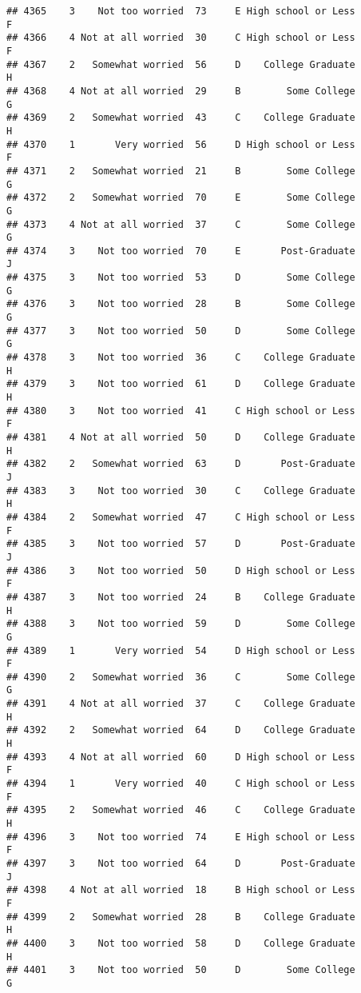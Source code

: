 \documentclass[
]{article}
\begin{document}
\begin{verbatim}
## 4365    3    Not too worried  73     E High school or Less         F
## 4366    4 Not at all worried  30     C High school or Less         F
## 4367    2   Somewhat worried  56     D    College Graduate         H
## 4368    4 Not at all worried  29     B        Some College         G
## 4369    2   Somewhat worried  43     C    College Graduate         H
## 4370    1       Very worried  56     D High school or Less         F
## 4371    2   Somewhat worried  21     B        Some College         G
## 4372    2   Somewhat worried  70     E        Some College         G
## 4373    4 Not at all worried  37     C        Some College         G
## 4374    3    Not too worried  70     E       Post-Graduate         J
## 4375    3    Not too worried  53     D        Some College         G
## 4376    3    Not too worried  28     B        Some College         G
## 4377    3    Not too worried  50     D        Some College         G
## 4378    3    Not too worried  36     C    College Graduate         H
## 4379    3    Not too worried  61     D    College Graduate         H
## 4380    3    Not too worried  41     C High school or Less         F
## 4381    4 Not at all worried  50     D    College Graduate         H
## 4382    2   Somewhat worried  63     D       Post-Graduate         J
## 4383    3    Not too worried  30     C    College Graduate         H
## 4384    2   Somewhat worried  47     C High school or Less         F
## 4385    3    Not too worried  57     D       Post-Graduate         J
## 4386    3    Not too worried  50     D High school or Less         F
## 4387    3    Not too worried  24     B    College Graduate         H
## 4388    3    Not too worried  59     D        Some College         G
## 4389    1       Very worried  54     D High school or Less         F
## 4390    2   Somewhat worried  36     C        Some College         G
## 4391    4 Not at all worried  37     C    College Graduate         H
## 4392    2   Somewhat worried  64     D    College Graduate         H
## 4393    4 Not at all worried  60     D High school or Less         F
## 4394    1       Very worried  40     C High school or Less         F
## 4395    2   Somewhat worried  46     C    College Graduate         H
## 4396    3    Not too worried  74     E High school or Less         F
## 4397    3    Not too worried  64     D       Post-Graduate         J
## 4398    4 Not at all worried  18     B High school or Less         F
## 4399    2   Somewhat worried  28     B    College Graduate         H
## 4400    3    Not too worried  58     D    College Graduate         H
## 4401    3    Not too worried  50     D        Some College         G

\end{verbatim}
\end{document}
